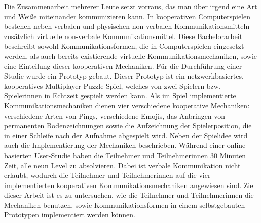 Die Zusammenarbeit mehrerer Leute setzt vorraus, das man über irgend eine Art und Weiße miteinander kommunizieren kann. In kooperativen Computerspielen bestehen neben verbalen und physischen non-verbalen Kommunikationsmitteln zusätzlich virtuelle non-verbale Kommunikationsmittel.
Diese Bachelorarbeit beschreibt sowohl Kommunikationsformen, die in Computerspielen eingesetzt werden, als auch bereits existierende virtuelle Kommunikationsmechaniken, sowie eine Einteilung dieser kooperativen Mechaniken. 
Für die Durchführung einer Studie wurde ein Prototyp gebaut. Dieser Prototyp ist ein netzwerkbasiertes, kooperatives Multiplayer Puzzle-Spiel, welches von zwei Spielern bzw. Spielerinnen in Echtzeit gespielt werden kann. Als im Spiel implementierte Kommunikationsmechaniken dienen vier verschiedene kooperative Mechaniken: verschiedene Arten von Pings, verschiedene Emojis, das Anbringen von permanenten Bodenzeichnungen sowie die Aufzeichnung der Spielerposition, die in einer Schleife nach der Aufnahme abgespielt wird. 
Neben der Spielidee wird auch die Implementierung der Mechaniken beschrieben.
Während einer online-basierten User-Studie haben die Teilnehmer und Teilnehmerinnen 30 Minuten Zeit, alle neun Level zu absolvieren. Dabei ist verbale Kommunikation nicht erlaubt, wodurch die Teilnehmer und Teilnehmerinnen auf die vier implementierten kooperativen Kommunikationsmechaniken angewiesen sind. Ziel dieser Arbeit ist es zu untersuchen, wie die Teilnehmer und Teilnehmerinnen die Mechaniken benutzen, sowie Kommunikationsformen in einem selbstgebauten Prototypen implementiert werden können.
